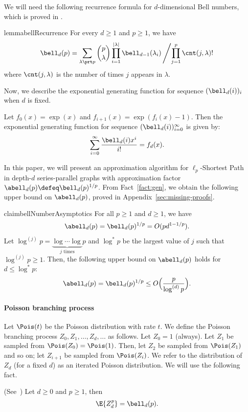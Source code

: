 \documentclass[11pt,a4paper]{article}
\begin{document}
We will need the following recurrence formula for $d$-dimensional Bell numbers, which is proved in .


\begin{restatable}{lemma}{bellRecurrence}
\label{claim:bell-recurrence}
For every $d\geq 1$ and $p \geq 1$, we have
$$
\bell_d(p) = \sum_{\lambda \prt p} \binom{p}{\lambda} \prod_{i=1}^{|\lambda|} \bell_{d-1}(\lambda_i)\left/ \prod_{j=1}^p \cnt(j, \lambda)!\right.
$$
where $\cnt(j, \lambda)$ is the number of times $j$ appears in $\lambda$.

\end{restatable}




Now, we describe the exponential generating function for sequence $(\bell_d(i))_i$ when $d$ is fixed. 
\begin{fact}\label{fact:gen}\cite[Example 5.2.4]{stanley2023enumerative}
Let $f_0(x) = \exp(x)$ and $f_{i+1}(x) = \exp(f_i(x) -1)$. Then the exponential generating function for sequence $(\bell_d(i))_{i=0}^\infty$ is given by:
\begin{equation}\label{eq:bell:recurrence}
\sum_{i=0}^\infty \frac{\bell_{d}(i) x^i}{i!} = f_d(x).
\end{equation}
\end{fact}
In this paper, we will present an approximation algorithm for $\ell_p$-Shortest Path in depth-$d$ series-parallel graphs with approximation factor $\abell_d(p) \defeq \bell_d(p)^{1/p}$. From Fact~\ref{fact:gen}, we obtain the following upper bound on $\abell_d(p)$, proved in Appendix~\ref{sec:missing-proofs}.

\begin{restatable}{claim}{bellNumberAsymptotics}\label{claim:bellNumberAsymptotics}
 For all $p \geq 1$ and $d\geq 1$, we have
$$\abell_d(p) = \bell_d(p)^{1/p} = O(pd^{1-1/p}).$$
Let $\log^{(j)} p = \underbrace{\log \cdots \log}_{j\text{ times}} p$ and $\log^* p $ be the largest value of $j$ such that $\log^{(j)} p \geq 1$. Then, the following upper bound on $\abell_d(p)$ holds for $d\leq \log^{*} p:$
$$\abell_d(p) = \bell_d(p)^{1/p} \leq O\Bigl(\frac{p}{\log^{(d)} p}\Bigr).
$$
\end{restatable}


\paragraph{Poisson branching process}
Let $\Pois(t)$ be the Poisson distribution with rate $t$. We define the Poisson branching process $Z_0, Z_1,\dots, Z_d, \dots$ as follows. Let $Z_0 = 1$ (always). Let $Z_1$ be sampled from $\Pois(Z_0) = \Pois(1)$. Then, let $Z_2$ be sampled from $\Pois(Z_1)$ and so on; let $Z_{i+1}$ be sampled from $\Pois(Z_{i})$. We refer to the distribution of $Z_d$ (for a fixed $d$) as an iterated Poisson distribution. We will use the following fact.
\begin{fact}\label{fact:iterated-poisson-moments} (See~\cite{de2011set}) Let $d \geq 0$ and $p\geq 1$, then
$$\E{Z_d^p} = \bell_d(p).$$
\end{fact}
\end{document}
